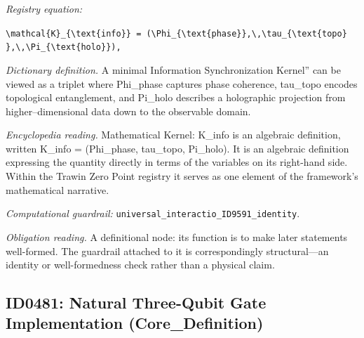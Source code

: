 \documentclass[11pt]{article}
\theoremstyle{remark}
\begin{document}
\noindent\textit{Registry equation:}\par
{\small\texttt{\textbackslash{}mathcal\{K\}\_\{\textbackslash{}text\{info\}\} = (\textbackslash{}Phi\_\{\textbackslash{}text\{phase\}\},\textbackslash{},\textbackslash{}tau\_\{\textbackslash{}text\{topo\} \},\textbackslash{},\textbackslash{}Pi\_\{\textbackslash{}text\{holo\}\}),}}\par\medskip
\noindent\textit{Dictionary definition.} A minimal Information Synchronization Kernel'' can be viewed as a triplet where Phi\_phase captures phase coherence, tau\_topo encodes topological entanglement, and Pi\_holo describes a holographic projection from higher--dimensional data down to the observable domain.\par\medskip
\noindent\textit{Encyclopedia reading.} Mathematical Kernel: K\_info is an algebraic definition, written K\_info = (Phi\_phase, tau\_topo, Pi\_holo). It is an algebraic definition expressing the quantity directly in terms of the variables on its right-hand side. Within the Trawin Zero Point registry it serves as one element of the framework's mathematical narrative.
\par\medskip\noindent\textit{Computational guardrail:} \texttt{universal\_interactio\_ID9591\_identity}.
\par\medskip\noindent\textit{Obligation reading.} A definitional node: its function is to make later statements well-formed. The guardrail attached to it is correspondingly structural---an identity or well-formedness check rather than a physical claim.

\subsection{ID0481: Natural Three-Qubit Gate Implementation (Core\_Definition)}
\end{document}
